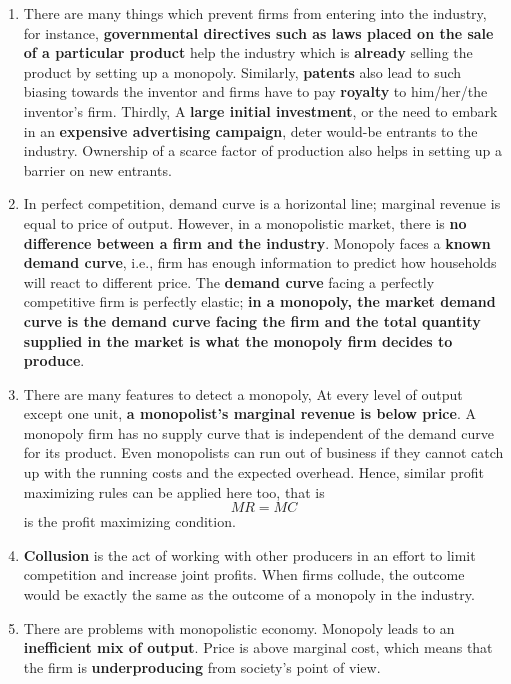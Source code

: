\documentclass[12pt]{article}
\begin{document}
\begin{enumerate}
\item There are many things which prevent firms from entering into the industry, for instance, \textbf{governmental directives such as laws placed on the sale of a particular product} help the industry which is \textbf{already} selling the product by setting up a monopoly. Similarly, \textbf{patents} also lead to such biasing towards the inventor and firms have to pay \textbf{royalty} to him/her/the inventor's firm. Thirdly, A \textbf{large initial investment}, or the need to embark in an \textbf{expensive advertising campaign}, deter would-be entrants to the industry. Ownership of a scarce factor of production also helps in setting up a barrier on new entrants. 
\item In perfect competition, demand curve is a horizontal line; marginal revenue is equal to price of output. However, in a monopolistic market, there is \textbf{no difference between a firm and the industry}. Monopoly faces a \textbf{known demand curve}, i.e., firm has enough information to predict how households will react to different price. The \textbf{demand curve} facing a perfectly competitive firm is perfectly elastic; \textbf{in a monopoly, the market demand curve is the demand curve facing the firm and the total quantity supplied in the market is what the monopoly firm decides to produce}.
\item There are many features to detect a monopoly, At every level of output except one unit, \textbf{a monopolist's marginal revenue is below price}. A monopoly firm has no supply curve that is independent of the demand curve for its product. Even monopolists can run out of business if they cannot catch up with the running costs and the expected overhead. Hence, similar profit maximizing rules can be applied here too, that is 
$$MR = MC$$ is the profit maximizing condition.
\item \textbf{Collusion} is the act of working with other producers in an effort to limit competition and increase joint profits. When firms collude, the outcome would be exactly the same as the outcome of a monopoly in the industry.
\item There are problems with monopolistic economy. Monopoly leads to an \textbf{inefficient mix of output}. Price is above marginal cost, which means that the firm is \textbf{underproducing} from society's point of view.


\end{enumerate}
\end{document}
